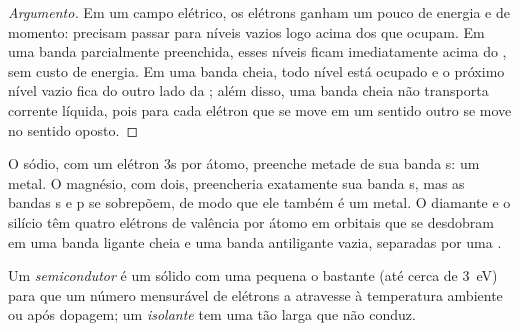 \begin{proof}[Argumento]
Em um campo elétrico, os elétrons ganham um pouco de energia e de momento: precisam
passar para níveis vazios logo acima dos que ocupam. Em uma banda parcialmente
preenchida, esses níveis ficam imediatamente acima do , sem custo de energia. Em
uma banda cheia, todo nível está ocupado e o próximo nível vazio fica do outro lado da ;
além disso, uma banda cheia não transporta corrente líquida, pois para cada elétron que se move
em um sentido outro se move no sentido oposto.
\end{proof}

O sódio, com um elétron 3s por átomo, preenche metade de sua banda s: um metal.
O magnésio, com dois, preencheria exatamente sua banda s, mas as bandas s e p
se sobrepõem, de modo que ele também é um metal. O diamante e o silício têm quatro elétrons de valência
por átomo em orbitais que se desdobram em uma banda ligante cheia e uma banda
antiligante vazia, separadas por uma .

\begin{definition}\label{def:b3:solid-state:classes}
Um \emph{semicondutor} é um sólido com uma  pequena
o bastante (até cerca de \qty{3}{eV}) para que um número mensurável de elétrons a atravesse
à temperatura ambiente ou após dopagem; um \emph{isolante}
tem uma  tão larga que não conduz.
\end{definition}

